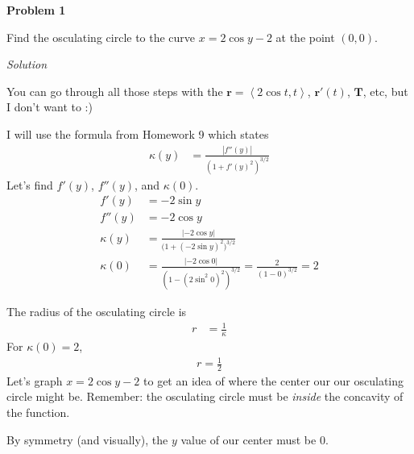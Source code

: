 \documentclass{article}
\newcommand{\lra}[1]{\left\langle #1 \right\rangle}
\newcommand{\T}[0]{\mathbf{T}}
\renewcommand{\r}[0]{\mathbf{r}}
\newcommand{\Solution}{\textit{Solution}}
\begin{document}
{}\textbf{Problem 1}

Find the osculating circle to the curve $x=2\cos y- 2$ at the point $(0,0)$.

\Solution

You can go through all those steps with the $\r=\lra{2\cos t, t}$, $\r'(t)$, $\T$, etc, but I don't want to :)

I will use the formula from Homework 9 which states
\begin{align*}
    \kappa (y)&=\frac{\left|f''(y)\right|}{(1+f'(y)^2)^{3/2}}
\end{align*}
Let's find $f'(y)$, $f''(y)$, and $\kappa(0)$.
\begin{align*}
    f'(y)&=-2\sin y\\
    f''(y)&=-2\cos y\\
    \kappa(y) &=\frac{\left|-2\cos y\right|}{\big(1+(-2\sin y)^2\big)^{3/2}}\\
    \kappa(0)&=\frac{\left|-2\cos0\right|}{(1-(2\sin^2 0)^2)^{3/2}}=\frac{2}{(1-0)^{3/2}}=2
\end{align*}

The radius of the osculating circle is
\begin{align*}
    r&=\frac{1}{\kappa}
\end{align*}
For $\kappa(0)=2$,
\begin{align*}
    r=\frac{1}{2}
\end{align*}
Let's graph $x=2\cos y-2$ to get an idea of where the center our our osculating circle might be. Remember: the osculating circle must be \textit{inside} the concavity of the function.
\begin{center}
\end{center}
By symmetry (and visually), the $y$ value of our center must be $0$.
\end{document}
